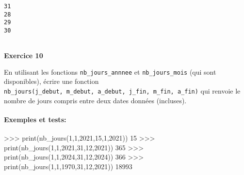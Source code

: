 \documentclass[a4paper,17pt]{extarticle}
\newenvironment{eleve}%
{\begin{activite}\color{noiramu}\\[-0.5cm]}
{\end{activite}}
\newenvironment{Shaded}{}{}
\newcommand{\DecValTok}[1]{\textcolor[rgb]{0.25,0.63,0.44}{{#1}}}
\newcommand{\NormalTok}[1]{{#1}}
\newcommand{\OperatorTok}[1]{\textcolor[rgb]{0.40,0.40,0.40}{{#1}}}
\newcommand{\BuiltInTok}[1]{{#1}}
\begin{document}
    \begin{Verbatim}[commandchars=\\\{\}]
31
28
29
30
    \end{Verbatim}
\begin{eleve}
    \textbf{Exercice 10}

En utilisant les fonctions \texttt{nb\_jours\_annnee} et
\texttt{nb\_jours\_mois} (qui sont disponibles), écrire une fonction
\texttt{nb\_jours(j\_debut,\ m\_debut,\ a\_debut,\ j\_fin,\ m\_fin,\ a\_fin)}
qui renvoie le nombre de jours compris entre deux dates données
(incluses).

\hypertarget{exemples-et-tests}{%
\paragraph{Exemples et tests:}\label{exemples-et-tests}}

\begin{Shaded}
\begin{Highlighting}[]
\OperatorTok{\textgreater{}\textgreater{}\textgreater{}} \BuiltInTok{print}\NormalTok{(nb\_jours(}\DecValTok{1}\NormalTok{,}\DecValTok{1}\NormalTok{,}\DecValTok{2021}\NormalTok{,}\DecValTok{15}\NormalTok{,}\DecValTok{1}\NormalTok{,}\DecValTok{2021}\NormalTok{))}
\DecValTok{15}
\OperatorTok{\textgreater{}\textgreater{}\textgreater{}} \BuiltInTok{print}\NormalTok{(nb\_jours(}\DecValTok{1}\NormalTok{,}\DecValTok{1}\NormalTok{,}\DecValTok{2021}\NormalTok{,}\DecValTok{31}\NormalTok{,}\DecValTok{12}\NormalTok{,}\DecValTok{2021}\NormalTok{))}
\DecValTok{365}
\OperatorTok{\textgreater{}\textgreater{}\textgreater{}} \BuiltInTok{print}\NormalTok{(nb\_jours(}\DecValTok{1}\NormalTok{,}\DecValTok{1}\NormalTok{,}\DecValTok{2024}\NormalTok{,}\DecValTok{31}\NormalTok{,}\DecValTok{12}\NormalTok{,}\DecValTok{2024}\NormalTok{))}
\DecValTok{366}
\OperatorTok{\textgreater{}\textgreater{}\textgreater{}} \BuiltInTok{print}\NormalTok{(nb\_jours(}\DecValTok{1}\NormalTok{,}\DecValTok{1}\NormalTok{,}\DecValTok{1970}\NormalTok{,}\DecValTok{31}\NormalTok{,}\DecValTok{12}\NormalTok{,}\DecValTok{2021}\NormalTok{))}
\DecValTok{18993}
\end{Highlighting}
\end{Shaded}
        
        \end{eleve}
\end{document}
